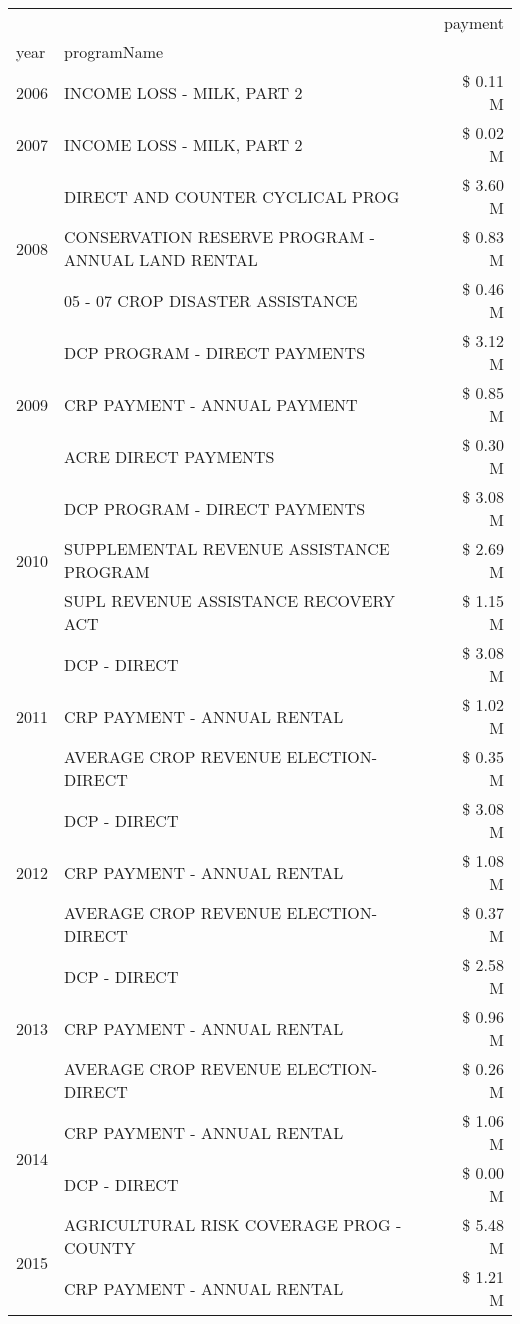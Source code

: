 \begin{tabular}{llr}
\toprule
 &  & payment \\
year & programName &  \\
\midrule
2006 & INCOME LOSS - MILK, PART 2 & \$ 0.11 M \\
\cline{1-3}
2007 & INCOME LOSS - MILK, PART 2 & \$ 0.02 M \\
\cline{1-3}
\multirow[t]{3}{*}{2008} & DIRECT AND COUNTER CYCLICAL PROG & \$ 3.60 M \\
 & CONSERVATION RESERVE PROGRAM - ANNUAL LAND RENTAL & \$ 0.83 M \\
 & 05 - 07 CROP DISASTER ASSISTANCE & \$ 0.46 M \\
\cline{1-3}
\multirow[t]{3}{*}{2009} & DCP PROGRAM - DIRECT PAYMENTS & \$ 3.12 M \\
 & CRP PAYMENT - ANNUAL PAYMENT & \$ 0.85 M \\
 & ACRE DIRECT PAYMENTS & \$ 0.30 M \\
\cline{1-3}
\multirow[t]{3}{*}{2010} & DCP PROGRAM - DIRECT PAYMENTS & \$ 3.08 M \\
 & SUPPLEMENTAL REVENUE ASSISTANCE PROGRAM & \$ 2.69 M \\
 & SUPL REVENUE ASSISTANCE RECOVERY ACT & \$ 1.15 M \\
\cline{1-3}
\multirow[t]{3}{*}{2011} & DCP - DIRECT & \$ 3.08 M \\
 & CRP PAYMENT - ANNUAL RENTAL & \$ 1.02 M \\
 & AVERAGE CROP REVENUE ELECTION-DIRECT & \$ 0.35 M \\
\cline{1-3}
\multirow[t]{3}{*}{2012} & DCP - DIRECT & \$ 3.08 M \\
 & CRP PAYMENT - ANNUAL RENTAL & \$ 1.08 M \\
 & AVERAGE CROP REVENUE ELECTION-DIRECT & \$ 0.37 M \\
\cline{1-3}
\multirow[t]{3}{*}{2013} & DCP - DIRECT & \$ 2.58 M \\
 & CRP PAYMENT - ANNUAL RENTAL & \$ 0.96 M \\
 & AVERAGE CROP REVENUE ELECTION-DIRECT & \$ 0.26 M \\
\cline{1-3}
\multirow[t]{2}{*}{2014} & CRP PAYMENT - ANNUAL RENTAL & \$ 1.06 M \\
 & DCP - DIRECT & \$ 0.00 M \\
\cline{1-3}
\multirow[t]{2}{*}{2015} & AGRICULTURAL RISK COVERAGE PROG - COUNTY & \$ 5.48 M \\
 & CRP PAYMENT - ANNUAL RENTAL & \$ 1.21 M \\

\end{tabular}
